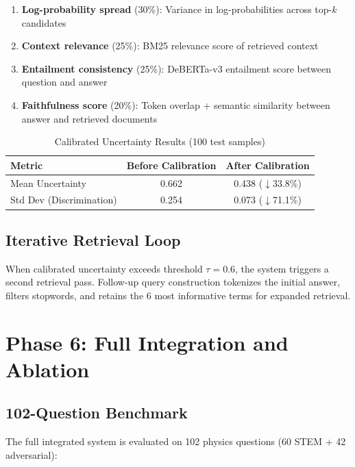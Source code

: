 \documentclass[11pt,a4paper]{article}
\begin{document}
\begin{enumerate}[leftmargin=*]
    \item \textbf{Log-probability spread} (30\%): Variance in log-probabilities across top-$k$ candidates
    \item \textbf{Context relevance} (25\%): BM25 relevance score of retrieved context
    \item \textbf{Entailment consistency} (25\%): DeBERTa-v3 entailment score between question and answer
    \item \textbf{Faithfulness score} (20\%): Token overlap + semantic similarity between answer and retrieved documents
\end{enumerate}

\begin{table}[h]
\centering
\caption{Calibrated Uncertainty Results (100 test samples)}
\begin{tabular}{lcc}
\toprule
\textbf{Metric} & \textbf{Before Calibration} & \textbf{After Calibration} \\
\midrule
Mean Uncertainty & 0.662 & 0.438 ($\downarrow$33.8\%) \\
Std Dev (Discrimination) & 0.254 & 0.073 ($\downarrow$71.1\%) \\
\bottomrule
\end{tabular}
\end{table}

\subsection{Iterative Retrieval Loop}

When calibrated uncertainty exceeds threshold $\tau=0.6$, the system triggers a second retrieval pass. Follow-up query construction tokenizes the initial answer, filters stopwords, and retains the 6 most informative terms for expanded retrieval.

\section{Phase 6: Full Integration and Ablation}

\subsection{102-Question Benchmark}

The full integrated system is evaluated on 102 physics questions (60 STEM + 42 adversarial):
\end{document}
